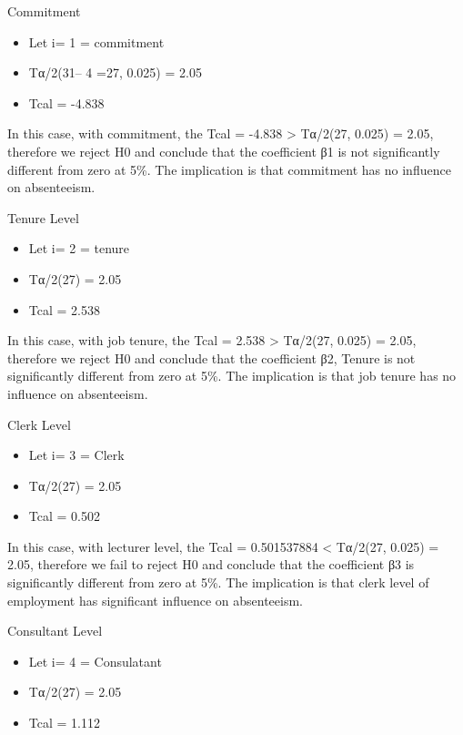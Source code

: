 \documentclass[
]{article}
\providecommand{\tightlist}{%
  \setlength{\itemsep}{0pt}\setlength{\parskip}{0pt}}
\begin{document}
Commitment

\begin{itemize}
\tightlist
\item
  Let i= 1 = commitment
\item
  Tα/2(31-- 4 =27, 0.025) = 2.05
\item
  Tcal = -4.838
\end{itemize}

In this case, with commitment, the \textbar Tcal\textbar{} = -4.838
\textgreater{} Tα/2(27, 0.025) = 2.05, therefore we reject H0 and
conclude that the coefficient β1 is not significantly different from
zero at 5\%. The implication is that commitment has no influence on
absenteeism.

Tenure Level

\begin{itemize}
\tightlist
\item
  Let i= 2 = tenure
\item
  Tα/2(27) = 2.05
\item
  Tcal = 2.538
\end{itemize}

In this case, with job tenure, the \textbar Tcal\textbar{} = 2.538
\textgreater{} Tα/2(27, 0.025) = 2.05, therefore we reject H0 and
conclude that the coefficient β2, Tenure is not significantly different
from zero at 5\%. The implication is that job tenure has no influence on
absenteeism.

Clerk Level

\begin{itemize}
\tightlist
\item
  Let i= 3 = Clerk
\item
  Tα/2(27) = 2.05
\item
  Tcal = 0.502
\end{itemize}

In this case, with lecturer level, the \textbar Tcal\textbar{} =
0.501537884 \textless{} Tα/2(27, 0.025) = 2.05, therefore we fail to
reject H0 and conclude that the coefficient β3 is significantly
different from zero at 5\%. The implication is that clerk level of
employment has significant influence on absenteeism.

Consultant Level

\begin{itemize}
\tightlist
\item
  Let i= 4 = Consulatant
\item
  Tα/2(27) = 2.05
\item
  Tcal = 1.112
\end{itemize}
\end{document}
